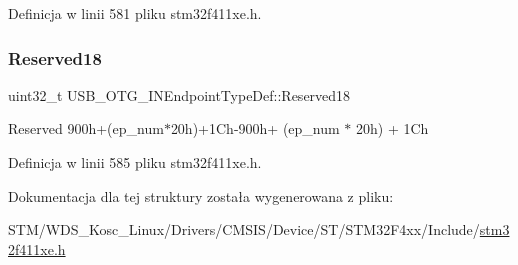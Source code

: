 Definicja w linii 581 pliku stm32f411xe.\+h.

\mbox{\label{struct_u_s_b___o_t_g___i_n_endpoint_type_def_a525d6997cba563967fd7ea22898ed4f6}} 
\subsubsection{\texorpdfstring{Reserved18}{Reserved18}}
{\footnotesize\ttfamily uint32\+\_\+t U\+S\+B\+\_\+\+O\+T\+G\+\_\+\+I\+N\+Endpoint\+Type\+Def\+::\+Reserved18}

Reserved 900h+(ep\+\_\+num$\ast$20h)+1\+Ch-\/900h+ (ep\+\_\+num $\ast$ 20h) + 1\+Ch 

Definicja w linii 585 pliku stm32f411xe.\+h.



Dokumentacja dla tej struktury została wygenerowana z pliku\+:\begin{DoxyCompactItemize}
\item 
S\+T\+M/\+W\+D\+S\+\_\+\+Kosc\+\_\+\+Linux/\+Drivers/\+C\+M\+S\+I\+S/\+Device/\+S\+T/\+S\+T\+M32\+F4xx/\+Include/\hyperlink{stm32f411xe_8h}{stm32f411xe.\+h}\end{DoxyCompactItemize}
